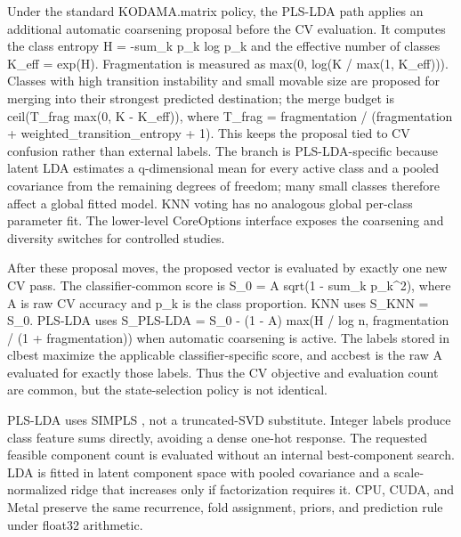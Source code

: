\documentclass[twoside,11pt]{article}
\begin{document}
Under the standard KODAMA.matrix policy, the PLS-LDA path applies an additional automatic coarsening proposal before the CV evaluation. It computes the class entropy H = -sum\_k p\_k log p\_k and the effective number of classes K\_eff = exp(H). Fragmentation is measured as max(0, log(K / max(1, K\_eff))). Classes with high transition instability and small movable size are proposed for merging into their strongest predicted destination; the merge budget is ceil(T\_frag max(0, K - K\_eff)), where T\_frag = fragmentation / (fragmentation + weighted\_transition\_entropy + 1). This keeps the proposal tied to CV confusion rather than external labels. The branch is PLS-LDA-specific because latent LDA estimates a q-dimensional mean for every active class and a pooled covariance from the remaining degrees of freedom; many small classes therefore affect a global fitted model. KNN voting has no analogous global per-class parameter fit. The lower-level CoreOptions interface exposes the coarsening and diversity switches for controlled studies.

After these proposal moves, the proposed vector is evaluated by exactly one new CV pass. The classifier-common score is S\_0 = A sqrt(1 - sum\_k p\_k\textasciicircum{}2), where A is raw CV accuracy and p\_k is the class proportion. KNN uses S\_KNN = S\_0. PLS-LDA uses S\_PLS-LDA = S\_0 - (1 - A) max(H / log n, fragmentation / (1 + fragmentation)) when automatic coarsening is active. The labels stored in clbest maximize the applicable classifier-specific score, and accbest is the raw A evaluated for exactly those labels. Thus the CV objective and evaluation count are common, but the state-selection policy is not identical.

PLS-LDA uses SIMPLS \citep{dejong1993simpls}, not a truncated-SVD substitute. Integer labels produce class feature sums directly, avoiding a dense one-hot response. The requested feasible component count is evaluated without an internal best-component search. LDA is fitted in latent component space with pooled covariance and a scale-normalized ridge that increases only if factorization requires it. CPU, CUDA, and Metal preserve the same recurrence, fold assignment, priors, and prediction rule under float32 arithmetic.
\end{document}
